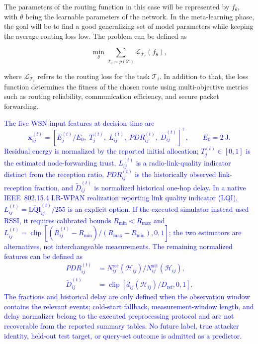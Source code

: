 \documentclass[pdflatex,sn-mathphys-num]{sn-jnl}
\newcommand{\Revised}[1]{\textcolor{blue}{#1}}
\begin{document}
The parameters of the routing function in this case will be represented by $f_{\theta}$, with $\theta$ being the learnable parameters of the network. In the meta-learning phase, the goal will be to find a good generalizing set of model parameters while keeping the average routing loss low. The problem can be defined as

\begin{equation}
\min_{\theta}
\sum_{\mathcal{T}_i\sim p(\mathcal{T})}
\mathcal{L}_{\mathcal{T}_i}(f_{\theta}),
\end{equation}

where $\mathcal{L}_{\mathcal{T}_i}$ refers to the routing loss for the task $\mathcal{T}_i$. In addition to that, the loss function determines the fitness of the chosen route using multi-objective metrics such as routing reliability, communication efficiency, and secure packet forwarding.

\Revised{The five WSN input features at decision time are
\begin{equation}
 \mathbf x_{ij}^{(t)}=
 \left[E_j^{(t)}/E_0,\; T_j^{(t)},\; L_{ij}^{(t)},\; PDR_{ij}^{(t)},\; \widetilde D_{ij}^{(t)}\right]^\top,\qquad E_0=2~\mathrm J.\label{eq:feature_r2}
\end{equation}
Residual energy is normalized by the reported initial allocation; $T_j^{(t)}\in[0,1]$ is the estimated node-forwarding trust, $L_{ij}^{(t)}$ is a radio-link-quality indicator distinct from the reception ratio, $PDR_{ij}^{(t)}$ is the historically observed link-reception fraction, and $\widetilde D_{ij}^{(t)}$ is normalized historical one-hop delay. In a native IEEE~802.15.4 LR-WPAN realization reporting link quality indicator (LQI), $L_{ij}^{(t)}=\overline{\mathrm{LQI}}_{ij}^{(t)}/255$ is an explicit option. If the executed simulator instead used RSSI, it requires calibrated bounds $R_{\min}<R_{\max}$ and $L_{ij}^{(t)}=\operatorname{clip}[(\overline R_{ij}^{(t)}-R_{\min})/(R_{\max}-R_{\min}),0,1]$; the two estimators are alternatives, not interchangeable measurements. The remaining normalized features can be defined as
\begin{align}
 PDR_{ij}^{(t)}&=N_{ij}^{\mathrm{rec}}(\mathcal H_{ij})/N_{ij}^{\mathrm{att}}(\mathcal H_{ij}),\label{eq:historical_pdr_final}\\
 \widetilde D_{ij}^{(t)}&=\operatorname{clip}\!\left[\overline d_{ij}(\mathcal H_{ij})/D_{\mathrm{ref}},0,1\right].\label{eq:historical_delay_final}
\end{align}
The fractions and historical delay are only defined when the observation window contains the relevant events; cold-start fallback, measurement-window length, and delay normalizer belong to the executed preprocessing protocol and are not recoverable from the reported summary tables. No future label, true attacker identity, held-out test target, or query-set outcome is admitted as a predictor.}
\end{document}
